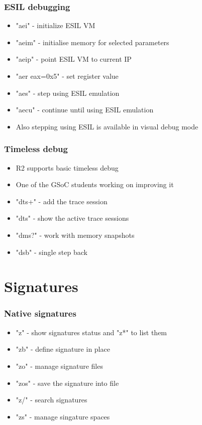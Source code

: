 \documentclass[10pt,pdf,utf8,english,compress,hyperref={unicode}]{beamer}
\begin{document}
\begin{frame}[fragile]
  \frametitle{ESIL debugging}
  \begin{itemize}
	  \item "aei" - initialize ESIL VM
	  \item "aeim" - initialise memory for selected parameters
	  \item "aeip" - point ESIL VM to current IP
	  \item "aer eax=0x5" - set register value
	  \item "aes" - step using ESIL emulation
	  \item "aecu" - continue until using ESIL emulation
	  \item Also stepping using ESIL is available in visual debug mode
  \end{itemize}
\end{frame}


\begin{frame}[fragile]
  \frametitle{Timeless debug}
  \begin{itemize}
	  \item R2 supports basic timeless debug
	  \item One of the GSoC students working on improving it
	  \item "dts+" - add the trace session
	  \item "dts" - show the active trace sessions
	  \item "dms?" - work with memory snapshots
	  \item "dsb" - single step back
  \end{itemize}
\end{frame}

\section{Signatures}

\begin{frame}[fragile]
  \frametitle{Native signatures}
  \begin{itemize}
	  \item "z" - show signatures status and "z*" to list them
	  \item "zb" - define signature in place
	  \item "zo" - manage signature files
	  \item "zos" - save the signature into file
	  \item "z/" - search signatures
	  \item "zs" - manage singature spaces
  \end{itemize}
\end{frame}
\end{document}
